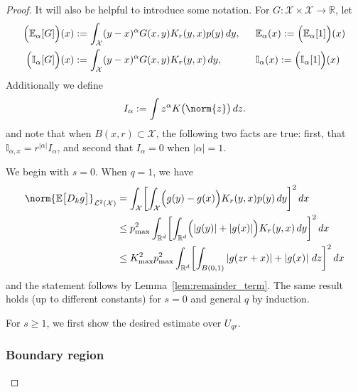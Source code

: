\documentclass{article}
\newcommand{\Reals}{\mathbb{R}}
\newcommand{\abs}[1]{\left \lvert #1 \right \rvert}
\newcommand{\1}{\mathbf{1}}
\newcommand{\Rd}{\Reals^d}
\newcommand{\Xset}{\mathcal{X}}
\newcommand{\Leb}{\mathcal{L}}
\newcommand{\Ebb}{\mathbb{E}}
\newcommand{\Ibb}{\mathbb{I}}
\theoremstyle{alden}
\theoremstyle{aldenthm}
\theoremstyle{definition}
\theoremstyle{remark}
\begin{document}
\begin{proof}
	It will also be helpful to introduce some notation. For $G: \Xset \times \Xset \to \Reals$, let
	\begin{align*}
	\Bigl(\Ebb_{\alpha}[G]\Bigr)(x) & := \int_{\Xset} (y - x)^{\alpha} G(x,y) K_r(y,x) p(y) \,dy,~~ && \Ebb_{\alpha}(x) := \Bigl(\Ebb_{\alpha}[1]\Bigr)(x) \\
	\Bigl(\Ibb_{\alpha}[G]\Bigr)(x) & := \int_{\Xset} (y - x)^{\alpha} G(x,y) K_r(y,x) \,dy,~~ && \Ibb_{\alpha}(x)  := \Bigl(\Ibb_{\alpha}[1]\Bigr)(x)
	\end{align*}
	Additionally we define
	\begin{equation*}
	I_{\alpha} := \int z^{\alpha} K\bigl(\norm{z}\bigr) \,dz.
	\end{equation*}
	and note that when $B(x,r) \subset \Xset$, the following two facts are true: first, that $\Ibb_{\alpha,x} = r^{\abs{\alpha}} I_{\alpha}$, and second that $I_{\alpha} = 0$ when $\abs{\alpha} = 1$.
	
	We begin with $s = 0$. When $q = 1$, we have
	\begin{align*}
	\norm{\Ebb\bigl[D_kg\bigr]}_{\Leb^2(\Xset)} & = \int_{\Xset} \biggl[\int_{\Xset} \Bigl(g(y) - g(x)\Bigr)K_r(y,x) p(y) \,dy \biggr]^2 \,dx \\
	& \leq p_{\max}^2 \int_{\Rd} \biggl[\int_{\Rd} \Bigl(\abs{g(y)} + \abs{g(x)}\Bigr)K_r(y,x) \,dy \biggr]^2 \,dx \\
	& \leq K_{\max}^2 p_{\max}^2 \int_{\Rd} \biggl[\int_{B(0,1)} \abs{g(zr + x)} + \abs{g(x)} \,dz \biggr]^2 \,dx
	\end{align*}
	and the statement follows by Lemma~\ref{lem:remainder_term}. The same result holds (up to different constants) for $s = 0$ and general $q$ by induction.
	
	For $s \geq 1$, we first show the desired estimate over $U_{qr}$.
	
	\subsubsection{Boundary region}
	

\end{proof}
\end{document}
